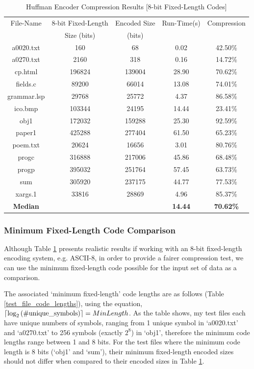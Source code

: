 \documentclass[12pt]{article}
\DeclarePairedDelimiter{\ceil}{\lceil}{\rceil}
\begin{document}
\begin{table}[H]
	\centering
	\begin{tabular}{| c | c | c | c | c |} 
		\hline
		File-Name & 8-bit Fixed-Length & Encoded Size & Run-Time(s) & Compression\\
		& Size (bits) & (bits) & & \\
		\hline
		a0020.txt & 160 & 68 & 0.02 & 42.50\%\\
		\hline
		a0270.txt & 2160 & 318 & 0.16 & 14.72\%\\
		\hline
		cp.html & 196824 & 139004 & 28.90 & 70.62\%\\
		\hline
		fields.c & 89200 & 66014 & 13.08 & 74.01\%\\
		\hline
		grammar.lsp & 29768 & 25772 & 4.37 & 86.58\%\\
		\hline
		ico.bmp & 103344 & 24195 & 14.44 & 23.41\%\\
		\hline
		obj1 & 172032 & 159288 & 25.30 & 92.59\%\\
		\hline
		paper1 & 425288 & 277404 & 61.50 & 65.23\%\\
		\hline
		poem.txt & 20624 & 16656 & 3.01 & 80.76\%\\
		\hline
		progc & 316888 & 217006 & 45.86 & 68.48\%\\
		\hline
		progp & 395032 & 251764 & 57.45 & 63.73\%\\
		\hline
		sum & 305920 & 237175 & 44.77 & 77.53\%\\
		\hline
		xargs.1 & 33816 & 28869 & 4.96 & 85.37\%\\
		\Xhline{3\arrayrulewidth}
		\textbf{Median} & & & \textbf{14.44} & \textbf{70.62\%}\\
		\hline
	\end{tabular}
	\caption{Huffman Encoder Compression Results [8-bit Fixed-Length Codes]}
	\label{huff_enc_results}
\end{table}

\subsubsection{Minimum Fixed-Length Code Comparison}
Although Table \ref{huff_enc_results} presents realistic results if working with an 8-bit fixed-length encoding system, e.g. ASCII-8, in order to provide a fairer compression test, we can use the minimum fixed-length code possible for the input set of data as a comparison.

The associated `minimum fixed-length' code lengths are as follows (Table \ref{test_file_code_lengths}), using the equation, $\ceil{\log_2{\text{(\#unique\_symbols)}}}=MinLength$. As the table shows, my test files each have unique numbers of symbols, ranging from 1 unique symbol in `a0020.txt' and `a0270.txt' to 256 symbols (exactly $2^8$) in `obj1', therefore the minimum code lengths range between 1 and 8 bits. For the test files where the minimum code length is 8 bits (`obj1' and `sum'), their minimum fixed-length encoded sizes should not differ when compared to their encoded sizes in Table \ref{huff_enc_results}.
\end{document}
